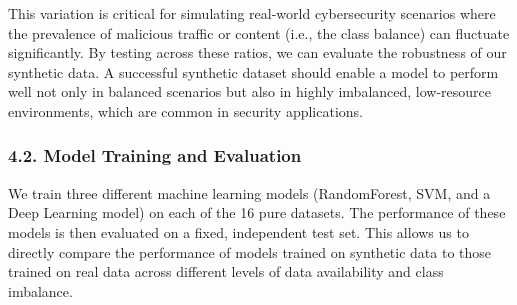 \documentclass{article}
\begin{document}
This variation is critical for simulating real-world cybersecurity scenarios where the prevalence of malicious traffic or content (i.e., the class balance) can fluctuate significantly. By testing across these ratios, we can evaluate the robustness of our synthetic data. A successful synthetic dataset should enable a model to perform well not only in balanced scenarios but also in highly imbalanced, low-resource environments, which are common in security applications.

\subsubsection*{4.2. Model Training and Evaluation}

We train three different machine learning models (RandomForest, SVM, and a Deep Learning model) on each of the 16 pure datasets. The performance of these models is then evaluated on a fixed, independent test set. This allows us to directly compare the performance of models trained on synthetic data to those trained on real data across different levels of data availability and class imbalance.
\end{document}
